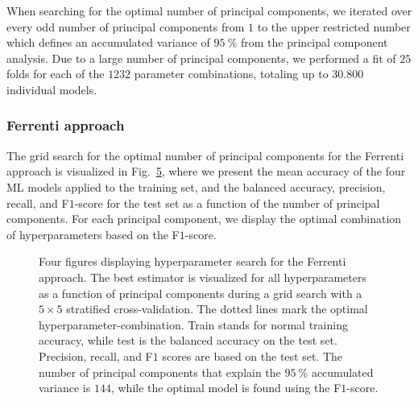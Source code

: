 \documentclass[superscriptaddress,unsortedaddress,
 amsmath,amssymb,
 aps,
]{revtex4-2}
\begin{document}
When searching for the optimal number of principal components, we iterated over every odd number of principal components from $1$ to the upper restricted number which defines an accumulated variance of $95 \ \%$ from the principal component analysis. Due to a large number of principal components, we performed a fit of  $25$ folds for each of the $1232$ parameter combinations, totaling up to $30.800$ individual models. 


\subsubsection*{Ferrenti approach}
The grid search for the optimal number of principal components for the Ferrenti approach is visualized in Fig.~\ref{fig:01-pca}, where we present the mean accuracy of the four ML models applied to the training set, and the balanced accuracy, precision, recall, and F$1$-score 
for the test set as a function of the number of principal components. For each principal component, we display the optimal combination of  hyperparameters based on the F$1$-score. 

\begin{figure}[ht!]
\begin{subfigure}[b]{1.0\textwidth}
    \centering
    
  \end{subfigure}
  \par\bigskip
  \begin{subfigure}[b]{0.5\textwidth}
    
    \caption{}
    \label{fig:q1-LOG}
  \end{subfigure}%
    \hfill
  \begin{subfigure}[b]{0.5\textwidth}
    
    \caption{}
    \label{fig:q1-DT}
  \end{subfigure}
  \begin{subfigure}[b]{0.5\textwidth}
    
    \caption{}
    \label{fig:q1-RF}
  \end{subfigure}%
   \hfill
  \begin{subfigure}[b]{0.5\textwidth}
    
    \caption{}
    \label{fig:q1-GB}
  \end{subfigure}
  \caption{Four figures displaying hyperparameter search for the Ferrenti approach. The best estimator is visualized for all hyperparameters as a function of principal components during a grid search with a $5\times5$ stratified cross-validation. The dotted lines mark the optimal hyperparameter-combination. Train stands for normal training accuracy, while test is the balanced accuracy on the test set. Precision, recall, and F$1$ scores are based on the test set. The number of principal components that explain the $95 \ \%$ accumulated variance is $144$, while the optimal model is found using the F$1$-score.}
  \label{fig:01-pca}
\end{figure}
\end{document}
